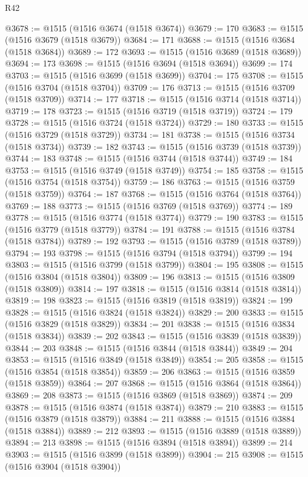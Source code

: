 \begin{lexlean}{R42}
\begin{coremodule}
{@3678 := @1515 (@1516 @3674 (@1518 @3674))
@3679 := 170
@3683 := @1515 (@1516 @3679 (@1518 @3679))
@3684 := 171
@3688 := @1515 (@1516 @3684 (@1518 @3684))
@3689 := 172
@3693 := @1515 (@1516 @3689 (@1518 @3689))
@3694 := 173
@3698 := @1515 (@1516 @3694 (@1518 @3694))
@3699 := 174
@3703 := @1515 (@1516 @3699 (@1518 @3699))
@3704 := 175
@3708 := @1515 (@1516 @3704 (@1518 @3704))
@3709 := 176
@3713 := @1515 (@1516 @3709 (@1518 @3709))
@3714 := 177
@3718 := @1515 (@1516 @3714 (@1518 @3714))
@3719 := 178
@3723 := @1515 (@1516 @3719 (@1518 @3719))
@3724 := 179
@3728 := @1515 (@1516 @3724 (@1518 @3724))
@3729 := 180
@3733 := @1515 (@1516 @3729 (@1518 @3729))
@3734 := 181
@3738 := @1515 (@1516 @3734 (@1518 @3734))
@3739 := 182
@3743 := @1515 (@1516 @3739 (@1518 @3739))
@3744 := 183
@3748 := @1515 (@1516 @3744 (@1518 @3744))
@3749 := 184
@3753 := @1515 (@1516 @3749 (@1518 @3749))
@3754 := 185
@3758 := @1515 (@1516 @3754 (@1518 @3754))
@3759 := 186
@3763 := @1515 (@1516 @3759 (@1518 @3759))
@3764 := 187
@3768 := @1515 (@1516 @3764 (@1518 @3764))
@3769 := 188
@3773 := @1515 (@1516 @3769 (@1518 @3769))
@3774 := 189
@3778 := @1515 (@1516 @3774 (@1518 @3774))
@3779 := 190
@3783 := @1515 (@1516 @3779 (@1518 @3779))
@3784 := 191
@3788 := @1515 (@1516 @3784 (@1518 @3784))
@3789 := 192
@3793 := @1515 (@1516 @3789 (@1518 @3789))
@3794 := 193
@3798 := @1515 (@1516 @3794 (@1518 @3794))
@3799 := 194
@3803 := @1515 (@1516 @3799 (@1518 @3799))
@3804 := 195
@3808 := @1515 (@1516 @3804 (@1518 @3804))
@3809 := 196
@3813 := @1515 (@1516 @3809 (@1518 @3809))
@3814 := 197
@3818 := @1515 (@1516 @3814 (@1518 @3814))
@3819 := 198
@3823 := @1515 (@1516 @3819 (@1518 @3819))
@3824 := 199
@3828 := @1515 (@1516 @3824 (@1518 @3824))
@3829 := 200
@3833 := @1515 (@1516 @3829 (@1518 @3829))
@3834 := 201
@3838 := @1515 (@1516 @3834 (@1518 @3834))
@3839 := 202
@3843 := @1515 (@1516 @3839 (@1518 @3839))
@3844 := 203
@3848 := @1515 (@1516 @3844 (@1518 @3844))
@3849 := 204
@3853 := @1515 (@1516 @3849 (@1518 @3849))
@3854 := 205
@3858 := @1515 (@1516 @3854 (@1518 @3854))
@3859 := 206
@3863 := @1515 (@1516 @3859 (@1518 @3859))
@3864 := 207
@3868 := @1515 (@1516 @3864 (@1518 @3864))
@3869 := 208
@3873 := @1515 (@1516 @3869 (@1518 @3869))
@3874 := 209
@3878 := @1515 (@1516 @3874 (@1518 @3874))
@3879 := 210
@3883 := @1515 (@1516 @3879 (@1518 @3879))
@3884 := 211
@3888 := @1515 (@1516 @3884 (@1518 @3884))
@3889 := 212
@3893 := @1515 (@1516 @3889 (@1518 @3889))
@3894 := 213
@3898 := @1515 (@1516 @3894 (@1518 @3894))
@3899 := 214
@3903 := @1515 (@1516 @3899 (@1518 @3899))
@3904 := 215
@3908 := @1515 (@1516 @3904 (@1518 @3904))
}
\end{coremodule}
\end{lexlean}
